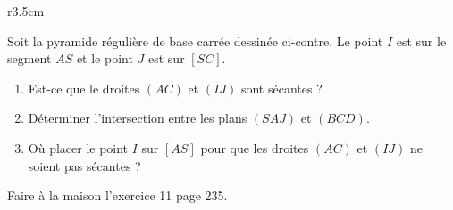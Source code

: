 
\begin{exercice}\label{exosmath-0081}

\begin{wrapfigure}{r}{3.5cm}
   \vspace{-0.3cm}        %
   \centering
   
\end{wrapfigure}

        Soit la pyramide régulière de base carrée dessinée ci-contre. Le point \( I\) est sur le segment \( AS\) et le point \( J\) est sur \( [SC]\).
        \begin{enumerate}
            \item
                Est-ce que le droites \( (AC)\) et \( (IJ)\) sont sécantes ?
            \item
                Déterminer l'intersection entre les plans \( (SAJ)\) et \( (BCD)\).
            \item
                Où placer le point \( I\) sur \( [AS]\) pour que les droites \( (AC)\) et \( (IJ)\) ne soient pas sécantes ?
        \end{enumerate}

        Faire à la maison l'exercice 11 page 235.


\end{exercice}

